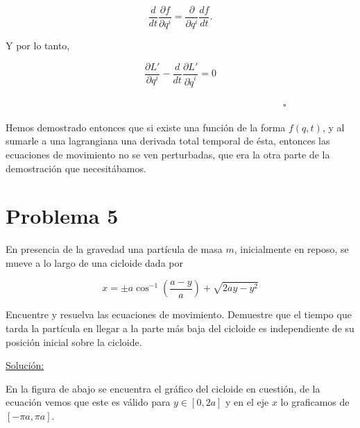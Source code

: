 \documentclass[a4paper,10pt]{article}
\numberwithin{equation}{section}
\begin{document}
\begin{equation}
 \frac{d}{dt}\frac{\partial f}{\partial q^i} =  \frac{\partial}{\partial q^i} \frac{df}{dt}.
\end{equation}

Y por lo tanto,

\begin{equation}
  \frac{\partial L'}{\partial q^i} - \frac{d}{dt}\frac{\partial L'}{\partial \dot{q}^i} = 0
\end{equation}

\vspace{.2cm} $\hspace{12cm} \square$

Hemos demostrado entonces que si existe una función de la forma $f(q,t)$, 
y al sumarle a una lagrangiana una derivada total temporal de ésta, entonces las 
ecuaciones de movimiento no se ven perturbadas, que era la otra parte de la demostración
que necesitábamos.

\section{Problema 5}

En presencia de la gravedad una partícula de masa $m$, inicialmente en reposo, se 
mueve a lo largo de una cicloide dada por 

$$
x = \pm a \cos^{-1}{\left(\frac{a-y}{a}\right)} + \sqrt{2ay-y^2}
$$

Encuentre y resuelva las ecuaciones de movimiento. Demuestre que el tiempo que tarda 
la partícula en llegar a la parte más baja del cicloide es independiente de su 
posición inicial sobre la cicloide.

\vspace{.3cm}

\underline{Solución:} \vspace{.3cm}

En la figura de abajo se encuentra el gráfico del cicloide en cuestión, de la ecuación 
vemos que este es válido para $y \in [0,2a]$ y en el eje $x$ lo graficamos de $[-\pi a, \pi a]$.
\end{document}
